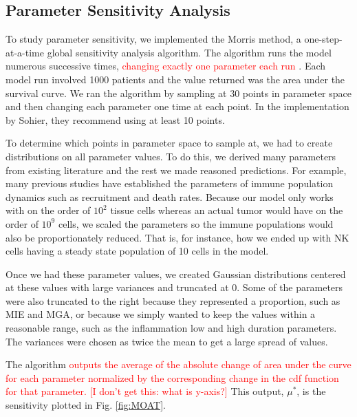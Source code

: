 \documentclass[11pt]{article}
\newcommand{\tcr} { \textcolor{red} }
\begin{document}
\subsection{Parameter Sensitivity Analysis}
To study parameter sensitivity, we implemented the Morris method, a one-step-at-a-time global sensitivity analysis algorithm.
The algorithm runs the model numerous successive times, \tcr{changing exactly one parameter each run} \cite{morris1991factorial, sohier2014improvement}.
Each model run involved 1000 patients and the value returned was the area under the survival curve.
We ran the algorithm by sampling at 30 points in parameter space and then changing each parameter one time at each point.
In the implementation by Sohier, they recommend using at least 10 points\cite{sohier2014improvement}.
\par
To determine which points in parameter space to sample at, we had to create distributions on all parameter values.
To do this, we derived many parameters from existing literature and the rest we made reasoned predictions.
For example, many previous studies have established the parameters of immune population dynamics such as recruitment and death rates\cite{de2014modeling}.
Because our model only works with on the order of $10^2$ tissue cells whereas an actual tumor would have on the order of $10^9$ cells\cite{de2014modeling}, we scaled the parameters so the immune populations would also be proportionately reduced.
That is, for instance, how we ended up with NK cells having a steady state population of 10 cells in the model.
\par
Once we had these parameter values, we created Gaussian distributions centered at these values with large variances and truncated at 0.
Some of the parameters were also truncated to the right because they represented a proportion, such as MIE and MGA, or because we simply wanted to keep the values within a reasonable range, such as the inflammation low and high duration parameters.
The variances were chosen as twice the mean to get a large spread of values.
\par
The algorithm \tcr{outputs the average of the absolute change of area under the curve for each parameter normalized by the corresponding change in the cdf function for that parameter. [I don't get this: what is y-axis?]}
This output, $\mu^*$, is the sensitivity plotted in Fig. \ref{fig:MOAT}.
\end{document}
